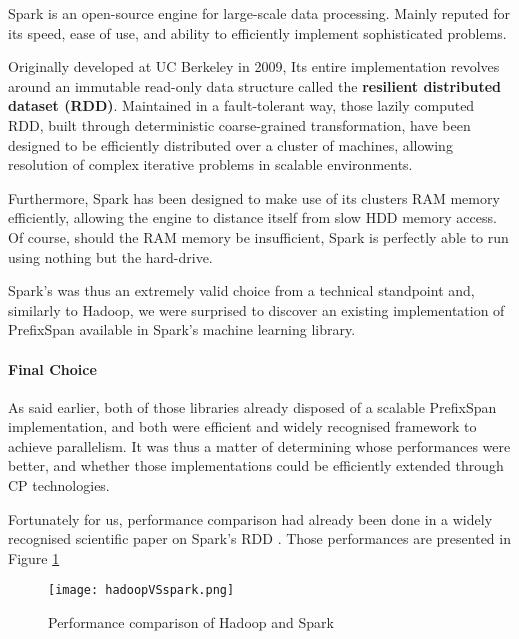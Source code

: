 \documentclass{eplmastersthesis}
\begin{document}
Spark is an open-source engine for large-scale data processing. Mainly reputed for its speed, ease of use, and ability to efficiently implement sophisticated problems. \newline

Originally developed at UC Berkeley in 2009, Its entire implementation revolves around an immutable read-only data structure called the \textbf{resilient distributed dataset (RDD)}. Maintained in a fault-tolerant way, those lazily computed RDD, built through deterministic coarse-grained transformation, have been designed to be efficiently distributed over a cluster of machines, allowing resolution of complex iterative problems in scalable environments. \newline

Furthermore, Spark has been designed to make use of its clusters RAM memory efficiently, allowing the engine to distance itself from slow HDD memory access. Of course, should the RAM memory be insufficient, Spark is perfectly able to run using nothing but the hard-drive. \newline

Spark's was thus an extremely valid choice from a technical standpoint and, similarly to Hadoop, we were surprised to discover an existing implementation of PrefixSpan available in Spark's machine learning library.

\paragraph{Final Choice}

As said earlier, both of those libraries already disposed of a scalable PrefixSpan implementation, and both were efficient and widely recognised framework to achieve parallelism. It was thus a matter of determining whose performances were better, and whether those implementations could be efficiently extended through CP technologies. \newline

Fortunately for us, performance comparison had already been done in a widely recognised scientific paper on Spark's RDD \cite{zaharia2012resilient}. Those performances are presented in Figure \ref{fig:hadoopVSspark}

\begin{figure}[h]
  \centering
  \texttt{[image: hadoopVSspark.png]}
  \caption{Performance comparison of Hadoop and Spark}
  \label{fig:hadoopVSspark}
\end{figure}
\end{document}
